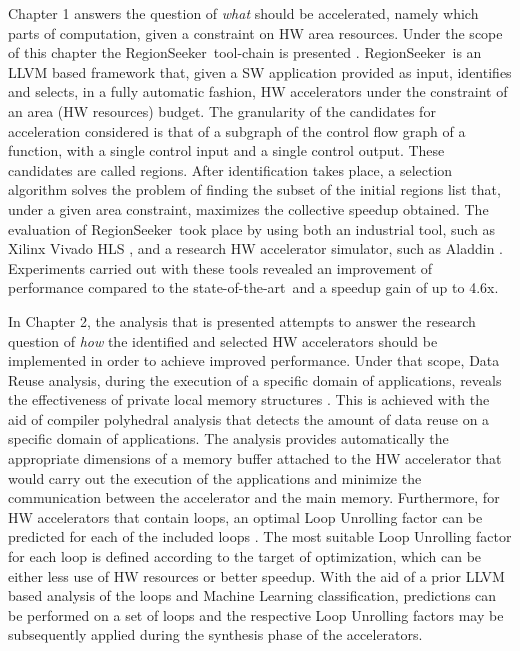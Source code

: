 \documentclass[]{usiinfthesis}
\newcommand{\rseeker}{{RegionSeeker}}
\newcommand{\SoTA}{{state-of-the-art}}
\begin{document}
Chapter 1 answers the question of {\em what} should be accelerated, namely which parts of 
computation, given a constraint on HW area resources. 
Under the scope of this chapter the \rseeker\ tool-chain is presented \cite{ZacharopoulosApr19}. 
\rseeker\ is an LLVM based framework 
that, given a SW application provided as input, identifies and selects, in a fully automatic fashion, HW 
accelerators under the constraint of an area (HW resources) budget. The granularity of the candidates for 
acceleration considered is that of a subgraph of the control flow graph of a function, with a single control 
input and a single control output. These candidates are called regions. After identification takes place, a 
selection algorithm solves the problem of 
finding the subset of the initial regions list that, under a given area constraint, maximizes the collective 
speedup obtained. The evaluation of \rseeker\ took place by using both an industrial tool, such as Xilinx
Vivado HLS \cite{VivadoHLSMar17}, and a research HW accelerator simulator, such as Aladdin \cite{ShaoJul14}. 
Experiments carried out with these tools revealed an improvement of performance compared to the \SoTA\
and a speedup gain of up to 4.6x. 
\par

In Chapter 2, the 
analysis that is presented attempts to answer the research question of {\em how} the identified and 
selected HW accelerators should be implemented in order to achieve improved performance. 
Under that scope, Data Reuse analysis, during the execution of a specific domain of applications, 
reveals the effectiveness of private local memory structures \cite{ZacharopoulosJan17}. 
This is achieved with the aid of compiler polyhedral analysis that detects the amount of data 
reuse on a specific domain of applications. The analysis provides automatically the appropriate dimensions 
of a memory buffer attached to the HW accelerator that would carry out the execution of the applications
and minimize the communication between the accelerator and the main memory.
Furthermore, for HW accelerators that contain loops, an optimal
Loop Unrolling factor can be predicted for each of the included loops \cite{ZacharopoulosJul18}. 
The most suitable Loop Unrolling factor
for each loop is defined according to the target of optimization, which can be either less use of HW
 resources or better speedup. With the aid of a prior LLVM based analysis 
 of the loops and Machine Learning classification, predictions can be performed on a set of loops and the respective 
Loop Unrolling factors may be subsequently applied during the synthesis phase of the accelerators. \par
\end{document}
